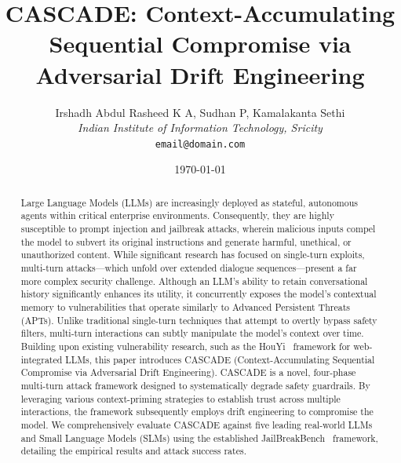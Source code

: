 \documentclass[10pt, a4paper, twocolumn]{article}
\title{CASCADE: Context-Accumulating Sequential Compromise via Adversarial Drift Engineering}
\author{Irshadh Abdul Rasheed K A, Sudhan P, Kamalakanta Sethi\\
\small \textit{Indian Institute of Information Technology, Sricity} \\
\small \texttt{email@domain.com}}
\date{\today}
\begin{document}
\maketitle

\begin{abstract}
Large Language Models (LLMs) are increasingly deployed as stateful, autonomous agents within critical enterprise environments. Consequently, they are highly susceptible to prompt injection and jailbreak attacks, wherein malicious inputs compel the model to subvert its original instructions and generate harmful, unethical, or unauthorized content. While significant research has focused on single-turn exploits, multi-turn attacks---which unfold over extended dialogue sequences---present a far more complex security challenge. Although an LLM’s ability to retain conversational history significantly enhances its utility, it concurrently exposes the model's contextual memory to vulnerabilities that operate similarly to Advanced Persistent Threats (APTs). Unlike traditional single-turn techniques that attempt to overtly bypass safety filters, multi-turn interactions can subtly manipulate the model's context over time. Building upon existing vulnerability research, such as the HouYi~\cite{houyi2023} framework for web-integrated LLMs, this paper introduces CASCADE (Context-Accumulating Sequential Compromise via Adversarial Drift Engineering). CASCADE is a novel, four-phase multi-turn attack framework designed to systematically degrade safety guardrails. By leveraging various context-priming strategies to establish trust across multiple interactions, the framework subsequently employs drift engineering to compromise the model. We comprehensively evaluate CASCADE against five leading real-world LLMs and Small Language Models (SLMs) using the established JailBreakBench~\cite{chao2024jailbreakbench} framework, detailing the empirical results and attack success rates.
\end{abstract}





\maketitle
\end{document}
